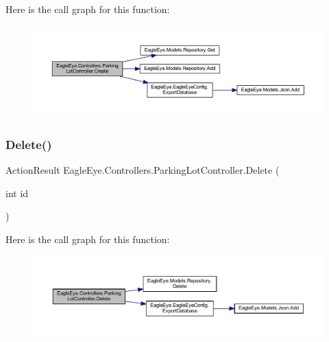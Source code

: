 Here is the call graph for this function\+:\nopagebreak
\begin{figure}[H]
\begin{center}
\leavevmode
\includegraphics[width=350pt]{class_eagle_eye_1_1_controllers_1_1_parking_lot_controller_a5af6a4b208418bca8a26f30255c62926_cgraph}
\end{center}
\end{figure}
\mbox{\label{class_eagle_eye_1_1_controllers_1_1_parking_lot_controller_aa26300d7c8f2fa2e41c15ceb0eb5c79e}} 
\subsubsection{\texorpdfstring{Delete()}{Delete()}}
{\footnotesize\ttfamily Action\+Result Eagle\+Eye.\+Controllers.\+Parking\+Lot\+Controller.\+Delete (\begin{DoxyParamCaption}\item[{int}]{id }\end{DoxyParamCaption})}





Here is the call graph for this function\+:\nopagebreak
\begin{figure}[H]
\begin{center}
\leavevmode
\includegraphics[width=350pt]{class_eagle_eye_1_1_controllers_1_1_parking_lot_controller_aa26300d7c8f2fa2e41c15ceb0eb5c79e_cgraph}
\end{center}
\end{figure}
\mbox{\label{class_eagle_eye_1_1_controllers_1_1_parking_lot_controller_a4c61e3d4b7e032a616e0624bf79fbba8}} 
